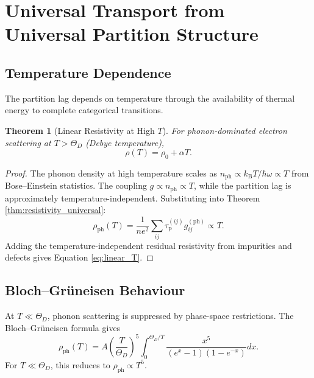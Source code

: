 \documentclass[twocolumn,10pt,a4paper]{article}
\newtheorem{theorem}{Theorem}[section]
\theoremstyle{definition}
\theoremstyle{remark}
\newcommand{\kB}{k_{\mathrm{B}}}
\newcommand{\tauP}{\tau_{\mathrm{p}}}
\begin{document}
\section{Universal Transport from Universal Partition Structure}
\label{sec:transport}

\subsection{Temperature Dependence}

The partition lag depends on temperature through the availability of thermal energy to complete categorical transitions.

\begin{theorem}[Linear Resistivity at High $T$]
\label{thm:linear_T}
For phonon-dominated electron scattering at $T > \Theta_D$ (Debye temperature),
\begin{equation}
\rho(T) = \rho_0 + \alpha T.
\label{eq:linear_T}
\end{equation}
\end{theorem}

\begin{proof}
The phonon density at high temperature scales as $n_{\mathrm{ph}} \propto \kB T/\hbar\omega \propto T$ from Bose--Einstein statistics. The coupling $g \propto n_{\mathrm{ph}} \propto T$, while the partition lag is approximately temperature-independent. Substituting into Theorem \ref{thm:resistivity_universal}:
\[
\rho_{\mathrm{ph}}(T) = \frac{1}{ne^2}\sum_{ij}\tauP^{(ij)} g_{ij}^{(\mathrm{ph})} \propto T.
\]
Adding the temperature-independent residual resistivity from impurities and defects gives Equation \eqref{eq:linear_T}.
\end{proof}

\subsection{Bloch--Gr\"{u}neisen Behaviour}

At $T \ll \Theta_D$, phonon scattering is suppressed by phase-space restrictions. The Bloch--Gr\"{u}neisen formula \citep{bloch1928,gruneisen1933} gives
\begin{equation}
\rho_{\mathrm{ph}}(T) = A \left(\frac{T}{\Theta_D}\right)^5\int_0^{\Theta_D/T}\frac{x^5}{(e^x - 1)(1 - e^{-x})} dx.
\label{eq:bloch_gruneisen}
\end{equation}
For $T \ll \Theta_D$, this reduces to $\rho_{\mathrm{ph}} \propto T^5$.
\end{document}

